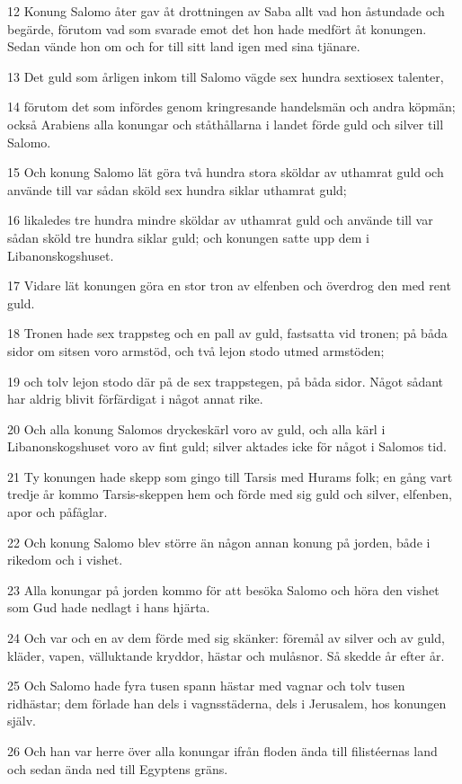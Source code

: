 \par 12 Konung Salomo åter gav åt drottningen av Saba allt vad hon åstundade och begärde, förutom vad som svarade emot det hon hade medfört åt konungen. Sedan vände hon om och for till sitt land igen med sina tjänare.
\par 13 Det guld som årligen inkom till Salomo vägde sex hundra sextiosex talenter,
\par 14 förutom det som infördes genom kringresande handelsmän och andra köpmän; också Arabiens alla konungar och ståthållarna i landet förde guld och silver till Salomo.
\par 15 Och konung Salomo lät göra två hundra stora sköldar av uthamrat guld och använde till var sådan sköld sex hundra siklar uthamrat guld;
\par 16 likaledes tre hundra mindre sköldar av uthamrat guld och använde till var sådan sköld tre hundra siklar guld; och konungen satte upp dem i Libanonskogshuset.
\par 17 Vidare lät konungen göra en stor tron av elfenben och överdrog den med rent guld.
\par 18 Tronen hade sex trappsteg och en pall av guld, fastsatta vid tronen; på båda sidor om sitsen voro armstöd, och två lejon stodo utmed armstöden;
\par 19 och tolv lejon stodo där på de sex trappstegen, på båda sidor. Något sådant har aldrig blivit förfärdigat i något annat rike.
\par 20 Och alla konung Salomos dryckeskärl voro av guld, och alla kärl i Libanonskogshuset voro av fint guld; silver aktades icke för något i Salomos tid.
\par 21 Ty konungen hade skepp som gingo till Tarsis med Hurams folk; en gång vart tredje år kommo Tarsis-skeppen hem och förde med sig guld och silver, elfenben, apor och påfåglar.
\par 22 Och konung Salomo blev större än någon annan konung på jorden, både i rikedom och i vishet.
\par 23 Alla konungar på jorden kommo för att besöka Salomo och höra den vishet som Gud hade nedlagt i hans hjärta.
\par 24 Och var och en av dem förde med sig skänker: föremål av silver och av guld, kläder, vapen, välluktande kryddor, hästar och mulåsnor. Så skedde år efter år.
\par 25 Och Salomo hade fyra tusen spann hästar med vagnar och tolv tusen ridhästar; dem förlade han dels i vagnsstäderna, dels i Jerusalem, hos konungen själv.
\par 26 Och han var herre över alla konungar ifrån floden ända till filistéernas land och sedan ända ned till Egyptens gräns.
